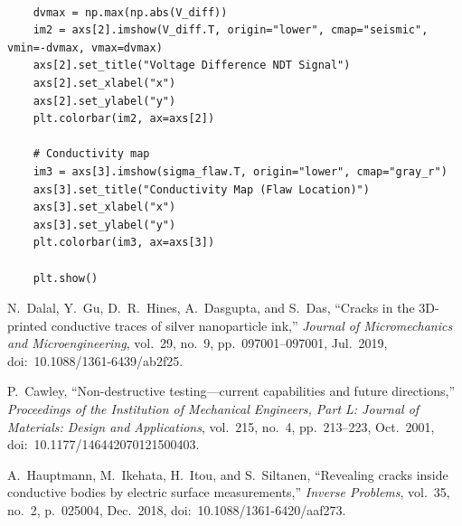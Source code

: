 \documentclass[reprint,amsmath,amssymb,aps]{revtex4-2}
\begin{document}
\begin{lstlisting}
    
    dvmax = np.max(np.abs(V_diff))
    im2 = axs[2].imshow(V_diff.T, origin="lower", cmap="seismic", vmin=-dvmax, vmax=dvmax)
    axs[2].set_title("Voltage Difference NDT Signal")
    axs[2].set_xlabel("x")
    axs[2].set_ylabel("y")
    plt.colorbar(im2, ax=axs[2])
    
    # Conductivity map
    im3 = axs[3].imshow(sigma_flaw.T, origin="lower", cmap="gray_r")
    axs[3].set_title("Conductivity Map (Flaw Location)")
    axs[3].set_xlabel("x")
    axs[3].set_ylabel("y")
    plt.colorbar(im3, ax=axs[3])
    
    plt.show()
\end{lstlisting}

\begin{thebibliography}{}
N.~Dalal, Y.~Gu, D.~R.~Hines, A.~Dasgupta, and S.~Das,
``Cracks in the 3D-printed conductive traces of silver nanoparticle ink,'' \textit{Journal of Micromechanics and Microengineering}, vol.~29, no.~9, pp.~097001--097001, Jul.~2019, doi:~10.1088/1361-6439/ab2f25.

P.~Cawley, ``Non-destructive testing---current capabilities and future directions,'' \textit{Proceedings of the Institution of Mechanical Engineers, Part L: Journal of Materials: Design and Applications}, vol.~215, no.~4, pp.~213--223, Oct.~2001,
doi:~10.1177/146442070121500403.

A.~Hauptmann, M.~Ikehata, H.~Itou, and S.~Siltanen,
``Revealing cracks inside conductive bodies by electric surface measurements,'' \textit{Inverse Problems}, vol.~35, no.~2, p.~025004, Dec.~2018, doi:~10.1088/1361-6420/aaf273.

\end{thebibliography}
\end{document}
